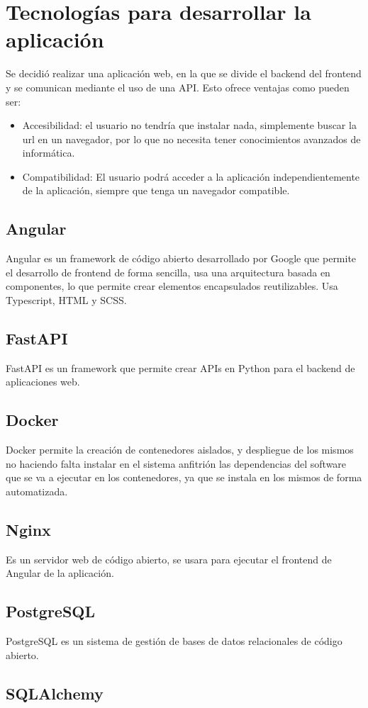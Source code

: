 \section {Tecnologías para desarrollar la aplicación}
Se decidió realizar una aplicación web, en la que se divide el backend del frontend y se comunican mediante el uso de una API. Esto ofrece ventajas como pueden ser:
\begin{itemize}
	\item  Accesibilidad: el usuario no tendría que instalar nada,  simplemente buscar la url en un navegador, por lo que no necesita tener conocimientos avanzados de informática.
	\item Compatibilidad: El usuario podrá acceder a la aplicación  independientemente de la aplicación, siempre que tenga un navegador compatible.
\end{itemize}

\subsection{Angular}
Angular es un framework de código abierto desarrollado por Google que permite el desarrollo de frontend de forma sencilla, usa una arquitectura basada en componentes, lo que  permite crear elementos encapsulados reutilizables. Usa Typescript,  HTML y SCSS.

\subsection{FastAPI}
FastAPI es un framework que permite crear APIs en Python para el backend de aplicaciones web.

\subsection{Docker}
Docker permite la creación de contenedores aislados, y despliegue de los mismos no haciendo falta instalar en el sistema anfitrión las dependencias del software que se va a ejecutar en los contenedores, ya que se instala en los mismos de forma automatizada. 

\subsection{Nginx}
Es un servidor web de código abierto, se usara para ejecutar el frontend  de Angular de la aplicación.

\subsection{PostgreSQL}
PostgreSQL es un sistema de gestión de bases de datos relacionales de código abierto.

\subsection{SQLAlchemy}
